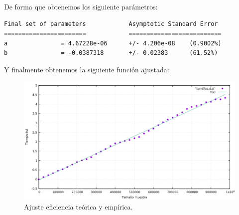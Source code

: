 De forma que obtenemos los siguiente parámetros:

\begin{shaded*}
\begin{verbatim}
Final set of parameters            Asymptotic Standard Error
=======================            ==========================
a               = 4.67228e-06      +/- 4.206e-08    (0.9002%)
b               = -0.0387318       +/- 0.02383      (61.52%)

\end{verbatim}
\end{shaded*}

Y finalmente obtenemos la siguiente función ajustada:
\begin{figure}[H]
    \begin{center}
        \includegraphics[scale=0.7]{imagenes/tt_adj.png}
        \caption{Ajuste eficiencia teórica y empírica.}
        \label{fig20}
    \end{center}
\end{figure}


